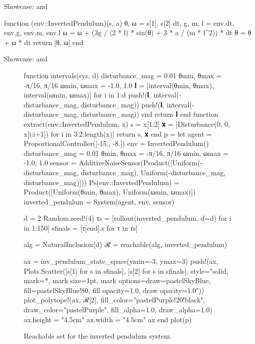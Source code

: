 \begin{frame}[fragile]{Showcase: \normalfont{} and }

{\small
\begin{algorithmblock}
\begin{juliaverbatim}
function (env::InvertedPendulum)(s, a)
    θ, ω = s[1], s[2]
    dt, g, m, l = env.dt, env.g, env.m, env.l
    ω = ω + (3g / (2 * l) * sin(θ) + 3 * a / (m * l^2)) * dt
    θ = θ + ω * dt
    return [θ, ω]
end
\end{juliaverbatim}
\end{algorithmblock}
}

\end{frame}


\begin{frame}[fragile]{Showcase: \normalfont{} and }
    
\begin{figure}
    \begin{jlcode}
    function intervals(sys, d)
        disturbance_mag = 0.01
        θmin, θmax = -π/16, π/16
        ωmin, ωmax =  -1.0, 1.0
        𝐈 = [interval(θmin, θmax), interval(ωmin, ωmax)]
        for i in 1:d
            push!(𝐈, interval(-disturbance_mag, disturbance_mag))
            push!(𝐈, interval(-disturbance_mag, disturbance_mag))
        end
        return 𝐈
    end
    function extract(env::InvertedPendulum, x)
        s = x[1:2]
        𝐱 = [Disturbance(0, 0, x[i:i+1]) for i in 3:2:length(x)]
        return s, 𝐱
    end
    p = let
        agent = ProportionalController([-15., -8.])
        env = InvertedPendulum()
        disturbance_mag = 0.01
        θmin, θmax = -π/16, π/16
        ωmin, ωmax =  -1.0, 1.0
        sensor = AdditiveNoiseSensor(Product([Uniform(-disturbance_mag, disturbance_mag), Uniform(-disturbance_mag, disturbance_mag)]))
        Ps(env::InvertedPendulum) = Product([Uniform(θmin, θmax), Uniform(ωmin, ωmax)])
        inverted_pendulum = System(agent, env, sensor)

        d = 2
        Random.seed!(4)
        τs = [rollout(inverted_pendulum, d=d) for i in 1:150]
        sfinals = [τ[end].s for τ in τs]

        alg = NaturalInclusion(d)
        ℛ = reachable(alg, inverted_pendulum)

        ax = inv_pendulum_state_space(ymin=-3, ymax=3)
        push!(ax, Plots.Scatter([s[1] for s in sfinals], [s[2] for s in sfinals], 
            style="solid, mark=*, mark size=1pt, mark options={draw=pastelSkyBlue, fill=pastelSkyBlue!80, fill opacity=1.0, draw opacity=1.0}"))
        plot_polytope!(ax, ℛ[2], fill_color="pastelPurple!20!black", draw_color="pastelPurple", fill_alpha=1.0, draw_alpha=1.0)
        ax.height = "4.5cm"
        ax.width = "4.5cm"
        ax
    end
    plot(p)
    \end{jlcode}
    \begin{center}
    \end{center}
    \caption{Reachable set for the inverted pendulum system.}
\end{figure}

\end{frame}
